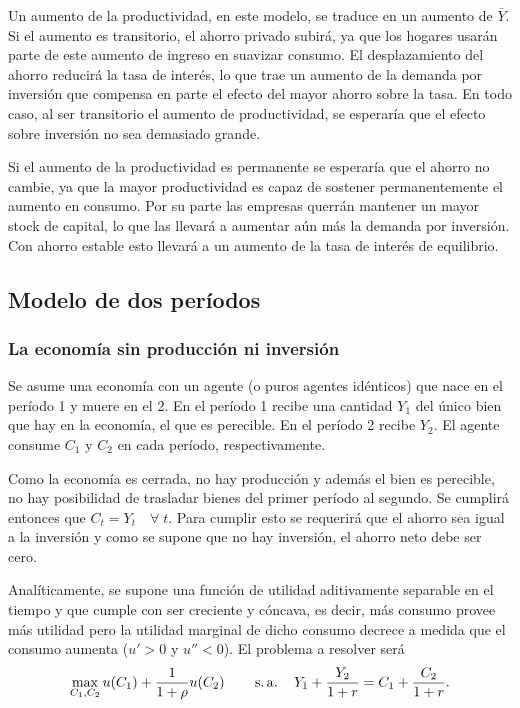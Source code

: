 \documentclass[DeGregorioResumen]{subfiles}
\begin{document}

Un aumento de la productividad, en este modelo, se traduce en un aumento de $\bar Y$. Si el aumento es transitorio, el ahorro privado subirá, ya que los hogares usarán parte de este aumento de ingreso en suavizar consumo. El desplazamiento del ahorro reducirá la tasa de interés, lo que trae un aumento de la demanda por inversión que compensa en parte el efecto del mayor ahorro sobre la tasa. En todo caso, al ser transitorio el aumento de productividad, se esperaría que el efecto sobre inversión no sea demasiado grande.

Si el aumento de la productividad es permanente se esperaría que el ahorro no cambie, ya que la mayor productividad es capaz de sostener permanentemente el aumento en consumo. Por su parte las empresas querrán mantener un mayor stock de capital, lo que las llevará a aumentar aún más la demanda por inversión. Con ahorro estable esto llevará a un aumento de la tasa de interés de equilibrio.

\subsection{Modelo de dos períodos}
\subsubsection{La economía sin producción ni inversión}

Se asume una economía con un agente (o puros agentes idénticos) que nace en el período 1 y muere en el 2. En el período 1 recibe una cantidad $Y_1$ del único bien que hay en la economía, el que es perecible. En el período 2 recibe $Y_2$. El agente consume $C_1$ y $C_2$ en cada período, respectivamente.

Como la economía es cerrada, no hay producción y además el bien es perecible, no hay posibilidad de trasladar bienes del primer período al segundo. Se cumplirá entonces que $C_t = Y_t  \quad \forall \; t $. Para cumplir esto se requerirá que el ahorro sea igual a la inversión y como se supone que no hay inversión, el ahorro neto debe ser cero.

Analíticamente, se supone una función de utilidad aditivamente separable en el tiempo y que cumple con ser creciente y cóncava, es decir, más consumo provee más utilidad pero la utilidad marginal de dicho consumo decrece a medida que el consumo aumenta ($u'>0$ y $u''<0$). El problema a resolver será
\begin{equation*}
\max_{C_1,C_2} u(C_1)+\frac{1}{1+\rho} u(C_2) \operatorname{\qquad s.a.\quad} Y_1+\frac{Y_2}{1+r}=C_1+\frac{C_2}{1+r}.
\end{equation*}
\end{document}
